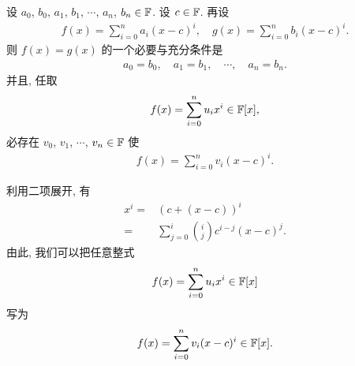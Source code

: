 \begin{proposition}
    设 $a_0$, $b_0$, $a_1$, $b_1$, $\cdots$, $a_n$, $b_n \in \mathbb{F}$. 设 $c \in \mathbb{F}$. 再设
    \begin{align*}
        f(x) = \sum_{i = 0}^n a_i (x-c)^i, \quad g(x) = \sum_{i = 0}^n b_i (x-c)^i.
    \end{align*}
    则 $f(x)=g(x)$ 的一个必要与充分条件是
    \begin{align*}
        a_0 = b_0, \quad a_1 = b_1, \quad \cdots, \quad a_n = b_n.
    \end{align*}
    并且, 任取
    \begin{align*}
        f(x) = \sum_{i = 0}^n u_i x^i \in \mathbb{F}[x],
    \end{align*}
    必存在 $v_0$, $v_1$, $\cdots$, $v_n \in \mathbb{F}$ 使
    \begin{align*}
        f(x) = \sum_{i = 0}^n v_i (x-c)^i.
    \end{align*}
\end{proposition}

利用二项展开, 有
\begin{align*}
    x^i
    = {} & (c + (x - c))^i                                    \\
    = {} & \sum_{j = 0}^{i} \binom{i}{j} c^{i - j} (x-c)^{j}.
\end{align*}
由此, 我们可以把任意整式
\begin{align*}
    f(x) = \sum_{i = 0}^n u_i x^i \in \mathbb{F}[x]
\end{align*}
写为
\begin{align*}
    f(x) = \sum_{i = 0}^n v_i (x-c)^i \in \mathbb{F}[x].
\end{align*}

